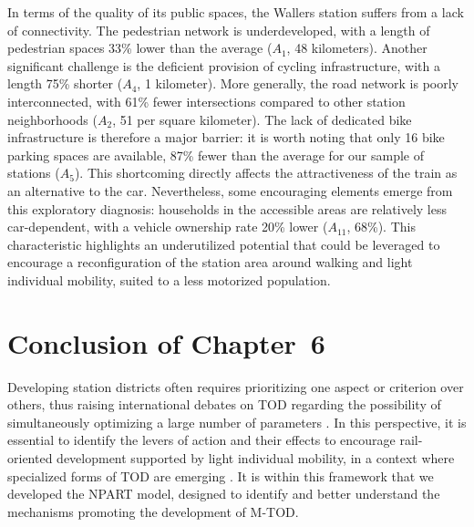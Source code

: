 \begin{refsegment}
In terms of the quality of its public spaces, the Wallers station suffers from a lack of connectivity. The pedestrian network is underdeveloped, with a length of pedestrian spaces 33\% lower than the average (\(A_{1}\), 48 kilometers). Another significant challenge is the deficient provision of cycling infrastructure, with a length 75\% shorter (\(A_{4}\), 1 kilometer). More generally, the road network is poorly interconnected, with 61\% fewer intersections compared to other station neighborhoods (\(A_{2}\), 51 per square kilometer). The lack of dedicated bike infrastructure is therefore a major barrier: it is worth noting that only 16 bike parking spaces are available, 87\% fewer than the average for our sample of stations (\(A_{5}\)). This shortcoming directly affects the attractiveness of the train as an alternative to the car. Nevertheless, some encouraging elements emerge from this exploratory diagnosis: households in the accessible areas are relatively less car-dependent, with a vehicle ownership rate 20\% lower (\(A_{11}\), 68\%). This characteristic highlights an underutilized potential that could be leveraged to encourage a reconfiguration of the station area around walking and light individual mobility, suited to a less motorized population.%

\newpage
{} %
\section*{Conclusion of Chapter~6
    \label{chap6:conclusion}
    }

Developing station districts often requires prioritizing one aspect or criterion over others, thus raising international debates on \acrshort{TOD} regarding the possibility of simultaneously optimizing a large number of parameters \textcolor{blue}{\autocite[181]{veloso_e_zarate_quartiers_2024}}. In this perspective, it is essential to identify the levers of action and their effects to encourage rail-oriented development supported by light individual mobility, in a context where specialized forms of \acrshort{TOD} are emerging \textcolor{blue}{\autocite[111]{cervero_transit-oriented_2017}}. It is within this framework that we developed the \acrshort{NPART} model, designed to identify and better understand the mechanisms promoting the development of \acrshort{M-TOD}.%


\end{refsegment}
